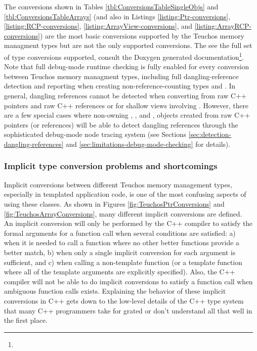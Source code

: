 \documentclass[pdf,ps2pdf,11pt]{SANDreport}
\begin{document}
The conversions shown in Tables {}\ref{tbl:ConversionsTableSingleObjs}
and {}\ref{tbl:ConversionsTableArrays} (and also in Listings
{}\ref{listing:Ptr-conversions}, {}\ref{listing:RCP-conversions},
{}\ref{listing:ArrayView-conversions}, and
{}\ref{listing:ArrayRCP-conversions}) are the most basic conversions
supported by the Teuchos memory managment types but are not the only
supported conversions.  The see the full set of type conversions
supported, consult the Doxygen generated
documentation\footnote{}.
Note that full debug-mode runtime checking is fully enabled for every
conversion between Teuchos memory managment types, including full
dangling-reference detection and reporting when creating
non-reference-counting types {} and {}.  In
general, dangling references cannot be detected when converting from
raw C++ pointers {} and raw C++ references {} or for
shallow views involving {}.  However, there are a few
special cases where non-owning {}, {}, and
{}, {} objects created from raw C++
pointers (or references) will be able to detect dangling references
through the sophisticated debug-mode node tracing system (see Sections
{}\ref{sec:detection-dangling-references} and
{}\ref{sec:limitations-debug-mode-checking} for details).


%
{}\subsubsection{Implicit type conversion problems and shortcomings}
\label{sec:conversion-problems}
%

Implicit conversions between different Teuchos memory management
types, especially in templated application code, is one of the most
confusing aspects of using these classes.  As shown in Figures
{}\ref{fig:TeuchosPtrConversions} and
{}\ref{fig:TeuchosArrayConversions}, many different implicit
conversions are defined.  An implicit conversion will only be
performed by the C++ compiler to satisfy the formal arguments for a
function call when several conditions are satisfied: a) when it is
needed to call a function where no other better functions provide a
better match, b) when only a single implicit conversion for each
argument is sufficient, and c) when calling a non-template function
(or a template function where all of the template arguments are
explicitly specified).  Also, the C++ compiler will not be able to do
implicit conversions to satisfy a function call when ambiguous
function calls exists.  Explaining the behavior of these implicit
conversions in C++ gets down to the low-level details of the C++ type
system that many C++ programmers take for grated or don't understand
all that well in the first place.
\end{document}
